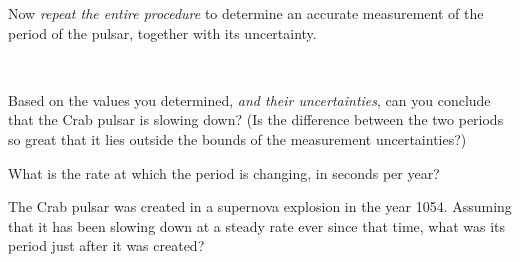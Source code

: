 Now {\it repeat the entire procedure} to determine an accurate measurement
of the period of the pulsar, together with its uncertainty.


\ \ \ 

Based on the values you determined, {\it and their uncertainties},
can you conclude that the Crab
pulsar is slowing down?  (Is the difference between the two periods so great
that it lies outside the bounds of the measurement uncertainties?)

\answerspace{1in}

What is the rate at which the period is changing, in seconds per year?

\answerspace{1in}

The Crab pulsar was created in a supernova explosion in the year 1054.
Assuming that it has been slowing down at a steady rate ever since that
time, what was its period just after it was created?

\answerspace{1in}
